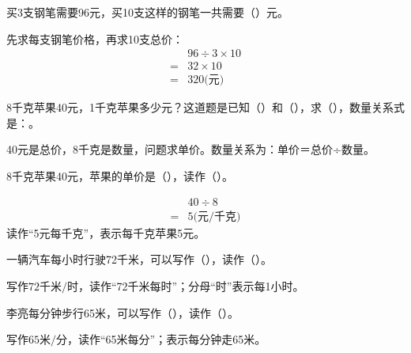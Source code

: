 买3支钢笔需要96元，买10支这样的钢笔一共需要（\hspace{1.8em}）元。\par
\begin{BookAnswer}
先求每支钢笔价格，再求10支总价：\[\begin{aligned} &96\div3\times10\\={}&32\times10\\={}&320\text{(元)}\end{aligned}\]
\end{BookAnswer}

8千克苹果40元，1千克苹果多少元？这道题是已知（\hspace{1.8em}）和（\hspace{1.8em}），求（\hspace{1.8em}），数量关系式是：\BookBlank{}。\par
\begin{BookAnswer}
40元是总价，8千克是数量，问题求单价。数量关系为：单价＝总价÷数量。
\end{BookAnswer}

8千克苹果40元，苹果的单价是（\hspace{1.8em}），读作（\hspace{1.8em}）。\par
\begin{BookAnswer}
\[\begin{aligned} &40\div8\\={}&5\text{(元/千克)}\end{aligned}\]读作“5元每千克”，表示每千克苹果5元。
\end{BookAnswer}

一辆汽车每小时行驶72千米，可以写作（\hspace{1.8em}），读作（\hspace{1.8em}）。\par
\begin{BookAnswer}
写作\(72\text{千米/时}\)，读作“72千米每时”；分母“时”表示每1小时。
\end{BookAnswer}

李亮每分钟步行65米，可以写作（\hspace{1.8em}），读作（\hspace{1.8em}）。\par
\begin{BookAnswer}
写作\(65\text{米/分}\)，读作“65米每分”；表示每分钟走65米。
\end{BookAnswer}

